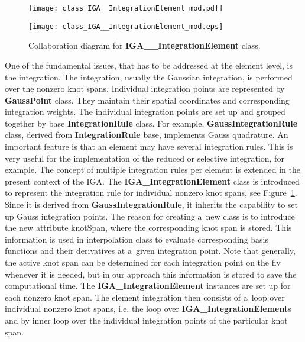 \documentclass[a4paper]{article}
\newcommand{\class}[1]{{\bf #1}}
\newcommand{\attribute}[1]{#1}
\begin{document}
\begin{figure}[b!]
\begin{center}
\ifpdf
\centerline{\texttt{[image: class\_IGA\_\_IntegrationElement\_mod.pdf]}}
\else
\centerline{\texttt{[image: class\_IGA\_\_IntegrationElement\_mod.eps]}}
\fi
\caption{Collaboration diagram for \class{IGA\_\_IntegrationElement} class.}
\label{IGA__IntegrationElement}
\end{center}
\vspace{-5mm}
\end{figure}

One of the fundamental issues, that has to be addressed at the element
level, is the integration. The integration, usually the Gaussian
integration, is performed over the nonzero knot spans. Individual
integration points are represented 
by \class{GaussPoint} class. They maintain their spatial
coordinates and corresponding integration weights. The individual
integration points are set up and grouped together by base
\class{IntegrationRule} class. For example,
\class{GaussIntegrationRule} class, derived from
\class{IntegrationRule} base, implements Gauss quadrature. An
important feature is that an element may have several integration
rules. This is very useful for the implementation of the reduced or selective
integration, for example. The concept of multiple integration rules
per element is extended in the present context of the IGA. The
\class{IGA\_IntegrationElement} class is introduced to represent the
integration rule for individual nonzero knot spans, see
Figure~\ref{IGA__IntegrationElement}. Since it is derived from
\class{GaussIntegrationRule}, it inherits the capability to set up
Gauss integration points. The reason for creating a~new class is to
introduce the new attribute \attribute{knotSpan}, where the
corresponding  knot span is stored. This information is used in
interpolation class to evaluate corresponding basis functions and
their derivatives at a~given integration point. Note that generally, the
active knot span can be determined for each integration point on the
fly whenever it is needed, but in our approach this information is stored to save
the computational time. The \class{IGA\_IntegrationElement} instances
are set up for each nonzero knot span. The element integration then
consists of a~loop over individual nonzero knot spans, i.e. the loop over
\class{IGA\_IntegrationElement}s and by inner loop over the individual
integration points of the particular knot span.
\end{document}
